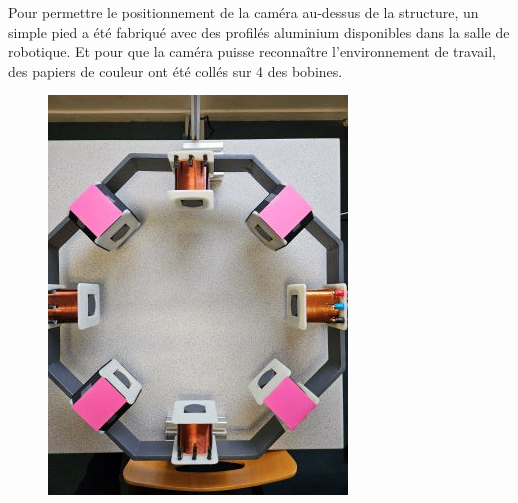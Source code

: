 \documentclass{article}
\begin{document}
\noindent
Pour permettre le positionnement de la caméra au-dessus de la structure, un simple pied a été fabriqué avec des profilés aluminium disponibles dans la salle de robotique. Et pour que la caméra puisse reconnaître l'environnement de travail, des papiers de couleur ont été collés sur 4 des bobines.
\begin{figure}[H]
    \centering
    \begin{minipage}{0.45\textwidth}
    \centering
        \includegraphics[width=\linewidth, angle=0]{Images/photoFabrications/octogone3.jpg}
    \end{minipage}\hfill
    \begin{minipage}{0.45\textwidth}
        \centering

\end{minipage}
\end{figure}
\end{document}
